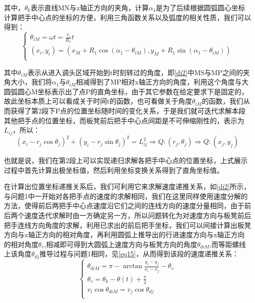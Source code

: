 \documentclass[withoutpreface,bwprint]{cumcmthesis} %
\begin{document}
其中，$\theta_k$表示直线MN与x轴正方向的夹角，计算$\alpha_1$是为了后续根据圆弧圆心坐标计算把手中心点的坐标的方便，利用三角函数关系以及弧度的相关性质，我们可以得到：
\begin{equation}
    \begin{cases}
    \theta_{iM} = \omega t = \frac{v_i}{R_1}t\\
    (x_i,y_i) = (x_M+R_1\cos{(\alpha_1-\theta_{iM})},y_M+R_1\sin{(\alpha_1-\theta_{iM})})\\
    \end{cases}
    \label{eq23}
\end{equation}

其中$\theta_{iM}$表示从进入调头区域开始到t时刻转过的角度，即\cref{di2}中MS与MP之间的夹角大小，我们将$\alpha_1$与$\theta_{iM}$相减得到了MP相对x轴正方向的角度，利用这个角度与大圆弧圆心M坐标表示出了点P的直角坐标，由于其它参数在给定要求下是固定的，故此坐标本质上可以看成关于时间t的函数，也可看做关于角度$\theta_{iM}$的函数，我们从而获得了第2段下P点的位置坐标随时间的变化关系，于是我们就可迭代求解本段其他把手点的位置坐标，而板凳前后把手中心点间距是不可伸缩刚性的，表示为$L_{ij}$，所以：
\begin{equation}
    (x_i-r_j\cos{\theta_j})^2+(y_i-r_j\sin{\theta_j})^2 = L_{ij}^2
    \Rightarrow Q:(r_j,\theta_j) \Rightarrow Q:(x_j,y_j)
    \label{eq24}
\end{equation}

也就是说，我们在第2段上可以实现递归求解各把手中心点的位置坐标，上式展示过程中首先计算出极坐标值，然后利用坐标变换关系得到了直角坐标值。

在计算出位置坐标递推关系后，我们可利用它来求解速度递推关系，如\cref{di2}所示，与问题1中一开始对各把手点的速度的求解相同，我们在这里同样使用速度分解的方法，使得前后两把手中心点速度沿它们之间的连线方向的速度分量相同，由于前后两个速度迭代求解时由一方确定另一方，所以问题转化为对速度方向与板凳前后把手连线方向角度的求解，利用已求出的前后把手坐标，我们可以间接计算出板凳方向与x轴正方向的相对角度，再利用圆弧上推导出的行进速度方向与x轴正方向的相对角度$\theta_v$,相减即可得到大圆弧上速度方向与板凳方向的角度$\theta_{diM}$,而等距螺线上该角度$\theta_{dj}$推导过程与问题1相同，见\cref{eq15}，从而得到该段的速度递推关系：
\begin{equation}
    \begin{cases}
    \theta_{diM} = \pi - \arctan{\frac{y_i-y_j}{x_i-x_j}}-\theta_v\\
    \theta_v = \theta_k - \theta(t) +\frac{\pi}{2}\\
    v_i\cos{\theta_{diM}} = v_j\cos{\theta_{dj}}\\
    \end{cases}
    \label{eq25}
\end{equation}
\end{document}
